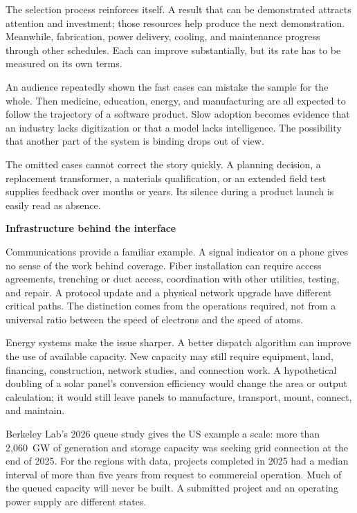 \documentclass[11pt,openany]{book}
\newcommand{\subhead}[1]{\par\medskip\noindent\textbf{#1}\par\nobreak\smallskip}
\begin{document}
The selection process reinforces itself. A result that can be demonstrated attracts attention and investment; those resources help produce the next demonstration. Meanwhile, fabrication, power delivery, cooling, and maintenance progress through other schedules. Each can improve substantially, but its rate has to be measured on its own terms.

An audience repeatedly shown the fast cases can mistake the sample for the whole. Then medicine, education, energy, and manufacturing are all expected to follow the trajectory of a software product. Slow adoption becomes evidence that an industry lacks digitization or that a model lacks intelligence. The possibility that another part of the system is binding drops out of view.

The omitted cases cannot correct the story quickly. A planning decision, a replacement transformer, a materials qualification, or an extended field test supplies feedback over months or years. Its silence during a product launch is easily read as absence.

\subhead{Infrastructure behind the interface}

Communications provide a familiar example. A signal indicator on a phone gives no sense of the work behind coverage. Fiber installation can require access agreements, trenching or duct access, coordination with other utilities, testing, and repair. A protocol update and a physical network upgrade have different critical paths. The distinction comes from the operations required, not from a universal ratio between the speed of electrons and the speed of atoms.

Energy systems make the issue sharper. A better dispatch algorithm can improve the use of available capacity. New capacity may still require equipment, land, financing, construction, network studies, and connection work. A hypothetical doubling of a solar panel's conversion efficiency would change the area or output calculation; it would still leave panels to manufacture, transport, mount, connect, and maintain.

Berkeley Lab's 2026 queue study gives the US example a scale: more than 2,060~GW of generation and storage capacity was seeking grid connection at the end of 2025. For the regions with data, projects completed in 2025 had a median interval of more than five years from request to commercial operation. Much of the queued capacity will never be built. A submitted project and an operating power supply are different states.\cite{berkeley2026queues}
\end{document}
